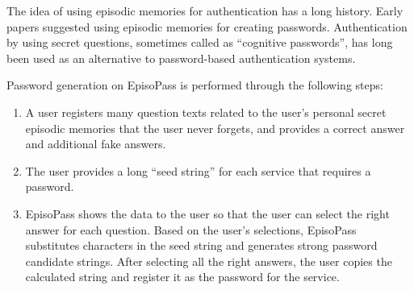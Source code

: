 \documentclass[runningheads,a4paper]{llncs}
\begin{document}
The idea of using episodic memories for authentication has a long history.
Early papers suggested using episodic memories for creating passwords.
Authentication by using secret questions,
sometimes called as ``cognitive passwords''\cite{Zviran:1990:UAC:100512.100538},
has long been used as an
alternative to password-based authentication systems.
%

Password generation on EpisoPass is performed through the following steps:

\begin{enumerate}
\item A user registers many question texts related to the user's personal
secret episodic memories that the user never forgets,
and provides a correct answer and additional fake answers.

\item The user provides a long ``seed string'' for each service that requires
a password.

\item EpisoPass shows the data to the user so that
the user can select the right answer for each question.
Based on the user's selections,
EpisoPass substitutes characters in the seed string and generates
strong password candidate strings.
After selecting all the right answers,
the user copies the calculated string
and register it as the password for the service.
\end{enumerate}
\end{document}
